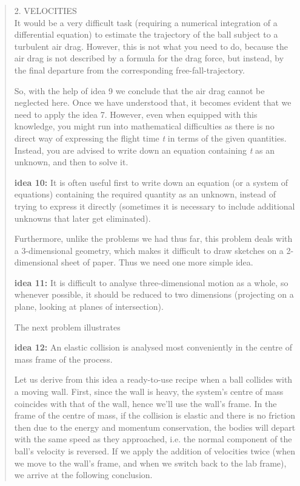 \documentclass[
]{article}
\begin{document}
\begin{longtable}[]{@{}l@{}}
\toprule
\endhead
 \\
\bottomrule
\end{longtable}

\begin{quote}
2. VELOCITIES\\
It would be a very diﬃcult task (requiring a numerical integration of a
diﬀerential equation) to estimate the trajectory of the ball subject to
a turbulent air drag. However, this is not what you need to do, because
the air drag is not described by a formula for the drag force, but
instead, by the ﬁnal departure from the corresponding
free-fall-trajectory.

So, with the help of idea 9 we conclude that the air drag cannot be
neglected here. Once we have understood that, it becomes evident that we
need to apply the idea 7. However, even when equipped with this
knowledge, you might run into mathematical diﬃculties as there is no
direct way of expressing the ﬂight time \emph{t} in terms of the given
quantities. Instead, you are advised to write down an equation
containing \emph{t} as an unknown, and then to solve it.

\textbf{idea 10:} It is often useful ﬁrst to write down an equation (or
a system of equations) containing the required quantity as an unknown,
instead of trying to express it directly (sometimes it is necessary to
include additional unknowns that later get eliminated).

Furthermore, unlike the problems we had thus far, this problem deals
with a 3-dimensional geometry, which makes it diﬃcult to draw sketches
on a 2-dimensional sheet of paper. Thus we need one more simple idea.

\textbf{idea 11:} It is diﬃcult to analyse three-dimensional motion as a
whole, so whenever possible, it should be reduced to two dimensions
(projecting on a plane, looking at planes of intersection).

The next problem illustrates

\textbf{idea 12:} An elastic collision is analysed most conveniently in
the centre of mass frame of the process.

Let us derive from this idea a ready-to-use recipe when a ball collides
with a moving wall. First, since the wall is heavy, the system's centre
of mass coincides with that of the wall, hence we'll use the wall's
frame. In the frame of the centre of mass, if the collision is elastic
and there is no friction then due to the energy and momentum
conservation, the bodies will depart with the same speed as they
approached, i.e. the normal component of the ball's velocity is
reversed. If we apply the addition of velocities twice (when we move to
the wall's frame, and when we switch back to the lab frame), we arrive
at the following conclusion.


\end{quote}
\end{document}
